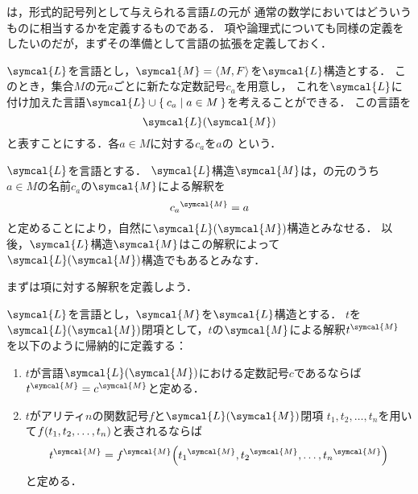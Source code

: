 は，形式的記号列として与えられる言語\(L\)の元が
通常の数学においてはどういうものに相当するかを定義するものである．
項や論理式についても同様の定義をしたいのだが，まずその準備として言語の拡張を定義しておく．

\begin{Def} \label{Def:namelanguage}
	\(\symcal{L}\)を言語とし，\(\symcal{M} = \pair{M, F}\)を\(\symcal{L}\)構造とする．
	このとき，集合\(M\)の元\(a\)ごとに新たな定数記号\(c_a\)を用意し，
	これを\(\symcal{L}\)に付け加えた言語\(\symcal{L} \cup \Set{c_a | a \in M}\)を考えることができる．
	この言語を%
	\begin{equation}
		\languagewithname{\symcal{L}}{\symcal{M}}
		\label{eq:languagewithname}
	\end{equation}
	と表すことにする．各\(a \in M\)に対する\(c_a\)を\(a\)の%
	という．
\end{Def}

\begin{Note}
	\(\symcal{L}\)を言語とする．
	\(\symcal{L}\)構造\(\symcal{M}\)は，の元のうち
	\(a \in M\)の名前\(c_a\)の\(\symcal{M}\)による解釈を
	\begin{equation}
		\interpretation{\symcal{M}}{c_a} = a
		\label{eq:languagewithnameinterpretation}
	\end{equation}
	と定めることにより，自然に\(\languagewithname{\symcal{L}}{\symcal{M}}\)構造とみなせる．
	以後，\(\symcal{L}\)構造\(\symcal{M}\)はこの解釈によって
	\(\languagewithname{\symcal{L}}{\symcal{M}}\)構造でもあるとみなす．
\end{Note}

まずは項に対する解釈を定義しよう．

\begin{Def} \label{Def:interpretationforterm}
	\(\symcal{L}\)を言語とし，\(\symcal{M}\)を\(\symcal{L}\)構造とする．
	\(t\)を\(\languagewithname{\symcal{L}}{\symcal{M}}\)閉項として，\(t\)の\(\symcal{M}\)による解釈\(\interpretation{\symcal{M}}{t}\)
	を以下のように帰納的に定義する：
	\begin{enumerate}
		\item \(t\)が言語\(\languagewithname{\symcal{L}}{\symcal{M}}\)における定数記号\(c\)であるならば
		      \(\interpretation{\symcal{M}}{t} = \interpretation{\symcal{M}}{c}\)と定める．
		\item \(t\)がアリティ\(n\)の関数記号\(f\)と\(\languagewithname{\symcal{L}}{\symcal{M}}\)閉項
		      \(t_1, t_2, \dots, t_n\)を用いて\(\apply{f}{t_1, t_2, \dots, t_n}\)と表されるならば
		      \begin{equation}
			      \interpretation{\symcal{M}}{t}
			      = \apply{\interpretation{\symcal{M}}{f}}{
				      \interpretation{\symcal{M}}{t_1},
				      \interpretation{\symcal{M}}{t_2},
				      \dots,
				      \interpretation{\symcal{M}}{t_n}
			      }
			      \label{eq:terminterpretation}
		      \end{equation}
		      と定める．
	\end{enumerate}
\end{Def}

